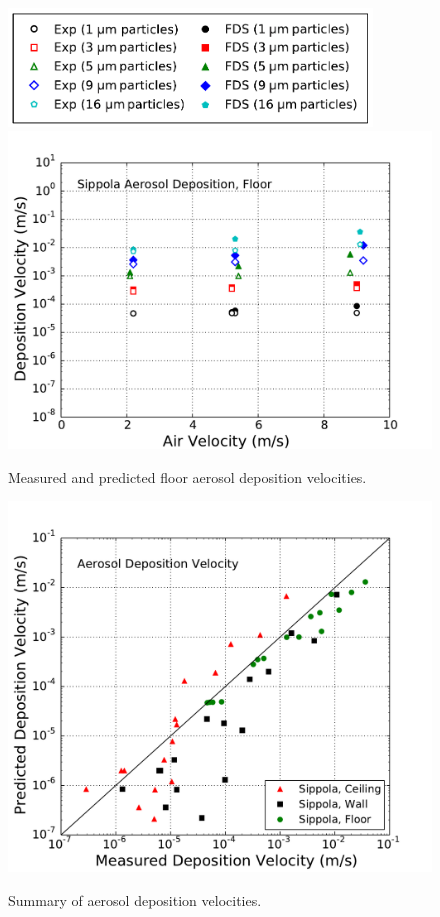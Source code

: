 \begin{figure}[p]
\centering
\includegraphics[width=3.8in]{Fig_Sippola_Aerosol_Deposition_Legend.pdf} \\
\includegraphics[width=5.0in]{Fig_Sippola_Aerosol_Floor_Deposition.pdf}
\caption[Floor aerosol deposition velocities]
{Measured and predicted floor aerosol deposition velocities.}
\label{fig:Sippola_Aerosol_Deposition_Velocity_3}
\end{figure}

\begin{figure}[!ht]
\centering
\includegraphics[width=5.0in]{Fig_Sippola_Aerosol_Deposition_Velocity_Scatter.pdf} \\
\caption[Summary of aerosol deposition velocities]
{Summary of aerosol deposition velocities.}
\label{fig:Summary_Aerosol_Deposition_Velocity}
\end{figure}

